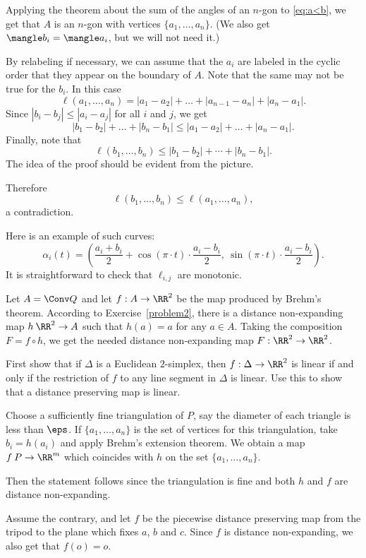 Applying the theorem about the sum of the angles of an $n$-gon to \ref{eq:a<b},
we get that $A$ is an $n$-gon with vertices $\{a_1,\dots,a_n\}$.
(We also get $\mangle b_i=\mangle a_i$, 
but we will not need it.)

By relabeling if necessary, we can assume that the $a_i$ are labeled in the cyclic order that they appear on the boundary of $A$.  Note that the same may not be true for the $b_i$.
In this case
$$\ell(a_1,\dots,a_{n})=|a_1-a_2|+\dots+|a_{n-1}-a_n|+|a_n-a_1|.$$
Since  $|b_i-b_j|\le |a_i-a_j|$ for all $i$ and $j$,
we get
$$|b_1-b_2|+\dots+|b_n-b_1|\le|a_1-a_2|+\dots+|a_n-a_1|.$$
Finally, note that 
$$\ell(b_1,\dots,b_{n})\le|b_1-b_2|+\cdots+|b_n-b_1|.$$
The idea of the proof should be evident from the picture.


Therefore 
$$\ell(b_1,\dots,b_{n})\le\ell(a_1,\dots,a_{n}),$$ 
a contradiction.


Here is an example of such curves:
$$
\alpha_i(t) = \left(\frac{a_i + b_i}{2} + 
\cos(\pi\cdot t)\cdot \frac{a_i - b_i}2,\  
\sin(\pi\cdot t)\cdot \frac{a_i - b_i}2\right). 
$$
It is straightforward to check that
$\ell_{i,j}$ are monotonic.

Let $A = \Conv Q$ and let $f: A \to \RR^2$ be the map produced by Brehm's theorem.
According to Exercise~\ref{problem2}, 
there is a distance non-expanding map $h\:\RR^2\to A$
such that $h(a)=a$ for any $a\in A$.
Taking the composition $F = f\circ h$, we get the needed distance non-expanding map $F: \RR^2\to \RR^2$.

First show that if $\Delta$ is a Euclidean $2$-simplex, then $f: \Delta \to \RR^2$ is linear if and only if the restriction of $f$ to any line segment in $\Delta$ is linear.  Use this to show that a distance preserving map is linear.

Choose a sufficiently fine triangulation of $P$, 
say the diameter of each triangle is less than $\eps$.
If $\{a_1,\dots,a_n\}$ is the set of vertices for this triangulation,
take $b_i=h(a_i)$ and apply Brehm's extension theorem.
We obtain a map $f\:P\to\RR^m$ which coincides with $h$ on the set $\{a_1,\dots,a_n\}$.

Then the statement follows since the triangulation is fine 
and  both $h$ and $f$ are distance non-expanding.


Assume the contrary, and let $f$ be the piecewise distance preserving map 
from the tripod to the plane which fixes $a$, $b$ and $c$.  Since $f$ is distance non-expanding, we also get that $f(o)=o$.

